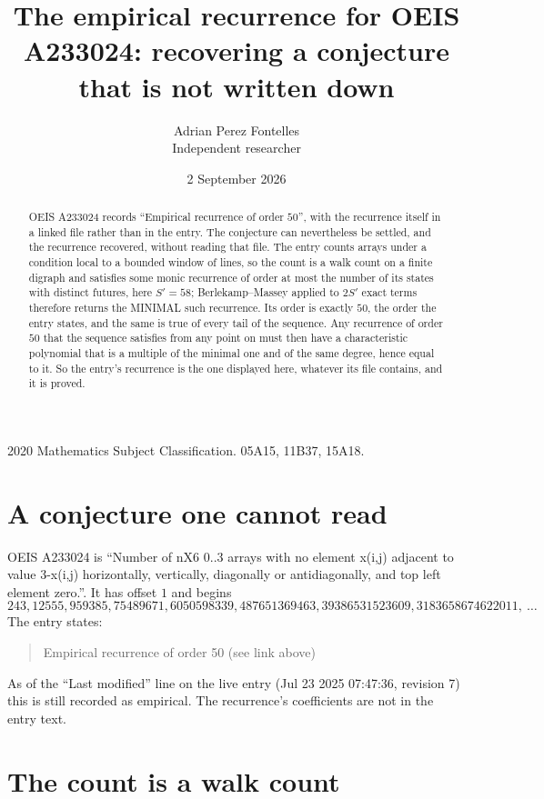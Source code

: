 \documentclass[11pt,a4paper]{article}
\title{The empirical recurrence for OEIS A233024: recovering a conjecture that is not written down}
\author{Adrian Perez Fontelles\\ \small Independent researcher}
\date{2 September 2026}
\theoremstyle{plain}
\theoremstyle{definition}
\begin{document}
\maketitle

\begin{abstract}
OEIS A233024 records ``Empirical recurrence of order $50$'', with the recurrence itself in a
linked file rather than in the entry. The conjecture can nevertheless be settled, and the
recurrence recovered, without reading that file. The entry counts arrays under a condition
local to a bounded window of lines, so the count is a walk count on a finite digraph and
satisfies some monic recurrence of order at most the number of its states with distinct
futures, here $S'=58$; Berlekamp--Massey applied to $2S'$ exact
terms therefore returns the MINIMAL such recurrence. Its order is exactly $50$, the order
the entry states, and the same is true of every tail of the sequence. Any recurrence of order
$50$ that the sequence satisfies from any point on must then have a characteristic
polynomial that is a multiple of the minimal one and of the same degree, hence equal to it. So
the entry's recurrence is the one displayed here, whatever its file contains, and it is
proved.
\end{abstract}

\noindent\small 2020 Mathematics Subject Classification. 05A15, 11B37, 15A18.\normalsize

\section{A conjecture one cannot read}

OEIS A233024 is ``Number of nX6 0..3 arrays with no element x(i,j) adjacent to value 3-x(i,j) horizontally, vertically, diagonally or antidiagonally, and top left element zero.''. It has offset $1$ and begins
\[
243, 12555, 959385, 75489671, 6050598339, 487651369463, 39386531523609, 3183658674622011,\ \dots
\]
The entry states:
\begin{quote}
Empirical recurrence of order 50 (see link above)
\end{quote}
As of the ``Last modified'' line on the live entry (Jul 23 2025 07:47:36, revision 7) this is still
recorded as empirical. The recurrence's coefficients are not in the entry text.

\section{The count is a walk count}
\end{document}
